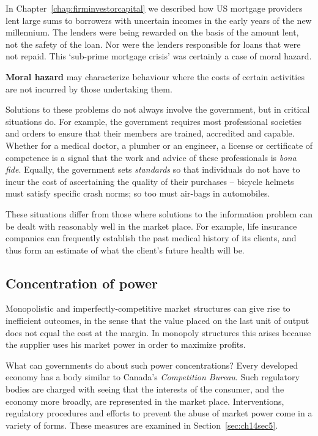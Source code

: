 In Chapter~\ref{chap:firminvestorcapital} we described how US mortgage
providers lent large sums to borrowers with uncertain incomes in the early
years of the new millennium. The lenders were being rewarded on the basis of
the amount lent, not the safety of the loan. Nor were the lenders
responsible for loans that were not repaid. This `sub-prime mortgage crisis'
was certainly a case of moral hazard.

\begin{DefBox}
	\textbf{Moral hazard} may characterize behaviour where the costs of certain activities are not incurred by those undertaking them.
\end{DefBox}

Solutions to these problems do not always involve the government, but in
critical situations do. For example, the government requires most
professional societies and orders to ensure that their members are trained,
accredited and capable. Whether for a medical doctor, a plumber or an
engineer, a license or certificate of competence is a signal that the work
and advice of these professionals is \textit{bona fide}. Equally, the
government sets \textit{standards} so that individuals do not have to incur
the cost of ascertaining the quality of their purchases -- bicycle helmets
must satisfy specific crash norms; so too must air-bags in automobiles.

These situations differ from those where solutions to the information
problem can be dealt with reasonably well in the market place. For example,
life insurance companies can frequently establish the past medical history
of its clients, and thus form an estimate of what the client's future health
will be.

\newhtmlpage

\subsection*{Concentration of power}

Monopolistic and imperfectly-competitive market structures can give rise to
inefficient outcomes, in the sense that the value placed on the last unit of
output does not equal the cost at the margin. In monopoly structures this
arises because the supplier uses his market power in order to maximize
profits.

What can governments do about such power concentrations? Every developed
economy has a body similar to Canada's \textit{Competition Bureau}. Such
regulatory bodies are charged with seeing that the interests of the
consumer, and the economy more broadly, are represented in the market place.
Interventions, regulatory procedures and efforts to prevent the abuse of
market power come in a variety of forms. These measures are examined in
Section~\ref{sec:ch14sec5}.

